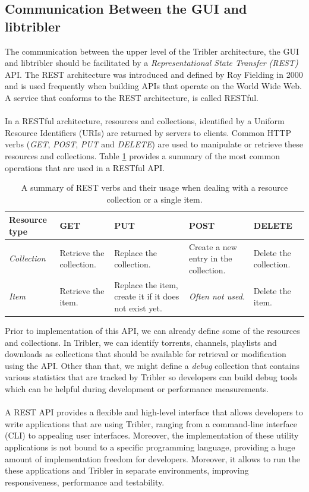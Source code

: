 \subsection{Communication Between the GUI and libtribler}
\label{subsec:communication-gui-libtribler}
The communication between the upper level of the Tribler architecture, the GUI and libtribler should be facilitated by a \emph{Representational State Transfer (REST)} API. The REST architecture was introduced and defined by Roy Fielding in 2000\cite{fielding2000fielding} and is used frequently when building APIs that operate on the World Wide Web. A service that conforms to the REST architecture, is called RESTful.\\\\
In a RESTful architecture, resources and collections, identified by a Uniform Resource Identifiers (URIs) are returned by servers to clients. Common HTTP verbs (\emph{GET}, \emph{POST}, \emph{PUT} and \emph{DELETE}) are used to manipulate or retrieve these resources and collections. Table \ref{table:rest-api-operations} provides a summary of the most common operations that are used in a RESTful API.\\

\begin{table}[h!]
	\centering
	\begin{tabularx}{\textwidth}{|X|X|X|X|X|}
		\hline
		\textbf{Resource type} & \textbf{GET} & \textbf{PUT} & \textbf{POST} & \textbf{DELETE} \\ \hline
		\emph{Collection} & Retrieve the collection. & Replace the collection. & Create a new entry in the collection. & Delete the collection.\\ \hline
		\emph{Item} & Retrieve the item. & Replace the item, create it if it does not exist yet. & \emph{Often not used.} & Delete the item.\\ \hline
	\end{tabularx}
	\caption{A summary of REST verbs and their usage when dealing with a resource collection or a single item.}
	\label{table:rest-api-operations}
\end{table}

Prior to implementation of this API, we can already define some of the resources and collections. In Tribler, we can identify torrents, channels, playlists and downloads as collections that should be available for retrieval or modification using the API. Other than that, we might define a \emph{debug} collection that contains various statistics that are tracked by Tribler so developers can build debug tools which can be helpful during development or performance measurements.\\\\
A REST API provides a flexible and high-level interface that allows developers to write applications that are using Tribler, ranging from a command-line interface (CLI) to appealing user interfaces. Moreover, the implementation of these utility applications is not bound to a specific programming language, providing a huge amount of implementation freedom for developers. Moreover, it allows to run the these applications and Tribler in separate environments, improving responsiveness, performance and testability.

